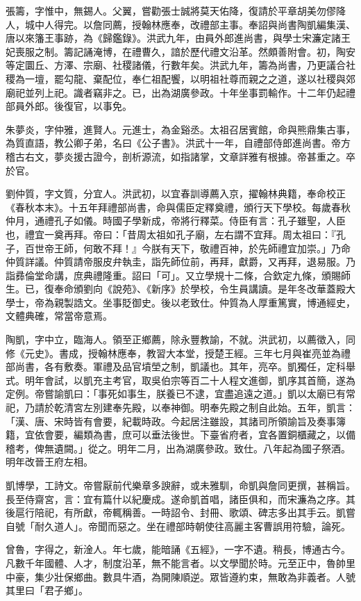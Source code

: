 \begin{pinyinscope}
張籌，字惟中，無錫人。父翼，嘗勸張士誠將莫天佑降，復請於平章胡美勿僇降人，城中人得完。以詹同薦，授翰林應奉，改禮部主事。奉詔與尚書陶凱編集漢、唐以來籓王事跡，為《歸鑑錄》。洪武九年，由員外郎進尚書，與學士宋濂定諸王妃喪服之制。籌記誦淹博，在禮曹久，諳於歷代禮文沿革。然頗善附會。初，陶安等定圜丘、方澤、宗廟、社稷諸儀，行數年矣。洪武九年，籌為尚書，乃更議合社稷為一壇，罷勾龍、棄配位，奉仁祖配饗，以明祖社尊而親之之道，遂以社稷與郊廟祀並列上祀。識者竊非之。已，出為湖廣參政。十年坐事罰輸作。十二年仍起禮部員外郎。後復官，以事免。

朱夢炎，字仲雅，進賢人。元進士，為金谿丞。太祖召居賓館，命與熊鼎集古事，為質直語，教公卿子弟，名曰《公子書》。洪武十一年，自禮部侍郎進尚書。帝方稽古右文，夢炎援古證今，剖析源流，如指諸掌，文章詳雅有根據。帝甚重之。卒於官。

劉仲質，字文質，分宜人。洪武初，以宜春訓導薦入京，擢翰林典籍，奉命校正《春秋本末》。十五年拜禮部尚書，命與儒臣定釋奠禮，頒行天下學校。每歲春秋仲月，通禮孔子如儀。時國子學新成，帝將行釋菜。侍臣有言：孔子雖聖，人臣也，禮宜一奠再拜。帝曰：「昔周太祖如孔子廟，左右謂不宜拜。周太祖曰：『孔子，百世帝王師，何敢不拜！』今朕有天下，敬禮百神，於先師禮宜加崇。」乃命仲質詳議。仲質請帝服皮弁執圭，詣先師位前，再拜，獻爵，又再拜，退易服。乃詣彞倫堂命講，庶典禮隆重。詔曰「可」。又立學規十二條，合欽定九條，頒賜師生。已，復奉命頒劉向《說苑》、《新序》於學校，令生員講讀。是年冬改華蓋殿大學士，帝為親製誥文。坐事貶御史。後以老致仕。仲質為人厚重篤實，博通經史，文體典確，常當帝意焉。

陶凱，字中立，臨海人。領至正鄉薦，除永豐教諭，不就。洪武初，以薦徵入，同修《元史》。書成，授翰林應奉，教習大本堂，授楚王經。三年七月與崔亮並為禮部尚書，各有敷奏。軍禮及品官墳塋之制，凱議也。其年，亮卒。凱獨任，定科舉式。明年會試，以凱充主考官，取吳伯宗等百二十人程文進御，凱序其首簡，遂為定例。帝嘗諭凱曰：「事死如事生，朕養已不逮，宜盡追遠之道。」凱以太廟已有常祀，乃請於乾清宮左別建奉先殿，以奉神御。明奉先殿之制自此始。五年，凱言：「漢、唐、宋時皆有會要，紀載時政。今起居注雖設，其諸司所領諭旨及奏事簿籍，宜依會要，編類為書，庶可以垂法後世。下臺省府者，宜各置銅櫃藏之，以備稽考，俾無遺闕。」從之。明年二月，出為湖廣參政。致仕。八年起為國子祭酒。明年改晉王府左相。

凱博學，工詩文。帝嘗厭前代樂章多諛辭，或未雅馴，命凱與詹同更撰，甚稱旨。長至侍齋宮，言：宜有篇什以紀慶成。遂命凱首唱，諸臣俱和，而宋濂為之序。其後扈行陪祀，有所獻，帝輒稱善。一時詔令、封冊、歌頌、碑志多出其手云。凱嘗自號「耐久道人」。帝聞而惡之。坐在禮部時朝使往高麗主客曹誤用符驗，論死。

曾魯，字得之，新淦人。年七歲，能暗誦《五經》，一字不遺。稍長，博通古今。凡數千年國體、人才，制度沿革，無不能言者。以文學聞於時。元至正中，魯帥里中豪，集少壯保鄉曲。數具牛酒，為開陳順逆。眾皆遵約束，無敢為非義者。人號其里曰「君子鄉」。


\end{pinyinscope}
